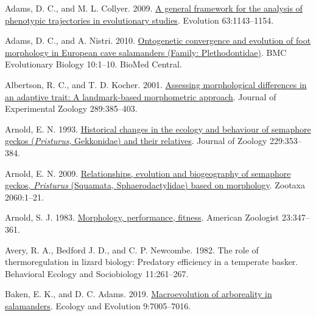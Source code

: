 \documentclass[
  11pt,
]{article}
\newlength{\cslhangindent}
\newlength{\cslentryspacingunit} %
\newenvironment{CSLReferences}[2] %
 {%
  \setlength{\parindent}{0pt}
  \ifodd #1
  \let\oldpar\par
  \def\par{\hangindent=\cslhangindent\oldpar}
  \fi
  \setlength{\parskip}{#2\cslentryspacingunit}
 }%
 {}
\begin{document}
\setlength{\parindent}{-0.25in} \setlength{\leftskip}{0.25in}
\setlength{\parskip}{8pt} \noindent

\hypertarget{refs}{}
\begin{CSLReferences}{1}{0}
\leavevmode{}%
Adams, D. C., and M. L. Collyer. 2009.
\href{https://doi.org/10.1111/j.1558-5646.2009.00649.x}{A general
framework for the analysis of phenotypic trajectories in evolutionary
studies}. Evolution 63:1143--1154.

\leavevmode{}%
Adams, D. C., and A. Nistri. 2010.
\href{https://doi.org/10.1186/1471-2148-10-216}{Ontogenetic convergence
and evolution of foot morphology in {E}uropean cave salamanders
({F}amily: {P}lethodontidae)}. BMC Evolutionary Biology 10:1--10. BioMed
Central.

\leavevmode{}%
Albertson, R. C., and T. D. Kocher. 2001.
\href{https://doi.org/10.1002/jez.1020}{Assessing morphological
differences in an adaptive trait: A landmark-based morphometric
approach}. Journal of Experimental Zoology 289:385--403.

\leavevmode{}%
Arnold, E. N. 1993.
\href{https://doi.org/10.1111/j.1469-7998.1993.tb02642.x}{Historical
changes in the ecology and behaviour of semaphore geckos
(\emph{{P}risturus}, {G}ekkonidae) and their relatives}. Journal of
Zoology 229:353--384.

\leavevmode{}%
Arnold, E. N. 2009.
\href{https://doi.org/10.11646/zootaxa.2060.1.1}{Relationships,
evolution and biogeography of semaphore geckos, \emph{{P}risturus}
({S}quamata, {S}phaerodactylidae) based on morphology}. Zootaxa
2060:1--21.

\leavevmode{}%
Arnold, S. J. 1983.
\href{https://doi.org/10.1093/icb/23.2.347}{Morphology, performance,
fitness}. American Zoologist 23:347--361.

\leavevmode{}%
Avery, R. A., Bedford J. D., and C. P. Newcombe. 1982. The role of
thermoregulation in lizard biology: Predatory efficiency in a temperate
basker. Behavioral Ecology and Sociobiology 11:261--267.

\leavevmode{}%
Baken, E. K., and D. C. Adams. 2019.
\href{https://doi.org/10.1002/ece3.5267}{Macroevolution of arboreality
in salamanders}. Ecology and Evolution 9:7005--7016.


\end{CSLReferences}
\end{document}
